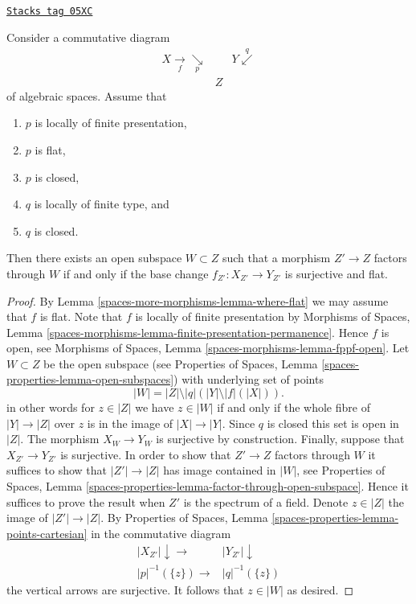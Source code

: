\begin{lemma}
\label{spaces-more-morphisms-lemma-where-surjective-flat}
\href{https://stacks.math.columbia.edu/tag/05XC}{\texttt{Stacks tag 05XC}}

Consider a commutative diagram
$$
\begin{array}{ccc}X \underset{f}{\longrightarrow}\underset{p}{\searrow} &  & Y \overset{q}{\swarrow} \\  & Z & \end{array}
$$
of algebraic spaces. Assume that
\begin{enumerate}
\item $p$ is locally of finite presentation,
\item $p$ is flat,
\item $p$ is closed,
\item $q$ is locally of finite type, and
\item $q$ is closed.
\end{enumerate}
Then there exists an open subspace $W \subset Z$
such that a morphism $Z' \to Z$ factors through $W$ if and only if the
base change $f_{Z'} : X_{Z'} \to Y_{Z'}$ is surjective and flat.
\end{lemma}

\begin{proof}
By
Lemma \ref{spaces-more-morphisms-lemma-where-flat}
we may assume that $f$ is flat.
Note that $f$ is locally of finite presentation by
Morphisms of Spaces,
Lemma \ref{spaces-morphisms-lemma-finite-presentation-permanence}.
Hence $f$ is open, see
Morphisms of Spaces, Lemma \ref{spaces-morphisms-lemma-fppf-open}.
Let $W \subset Z$ be the open subspace (see
Properties of Spaces, Lemma
\ref{spaces-properties-lemma-open-subspaces})
with underlying set of points
$$
|W| = |Z| \setminus |q|\left(|Y| \setminus |f|(|X|)\right).
$$
in other words for $z \in |Z|$ we have $z \in |W|$ if and only
if the whole fibre of $|Y| \to |Z|$ over $z$ is in the image of
$|X| \to |Y|$. Since $q$ is closed this set is open in $|Z|$.
The morphism $X_W \to Y_W$ is surjective by construction.
Finally, suppose that $X_{Z'} \to Y_{Z'}$ is surjective.
In order to show that $Z' \to Z$ factors through $W$ it suffices to show
that $|Z'| \to |Z|$ has image contained in $|W|$, see
Properties of Spaces, Lemma
\ref{spaces-properties-lemma-factor-through-open-subspace}.
Hence it suffices to prove the result when $Z'$ is the spectrum of a field.
Denote $z \in |Z|$ the image of $|Z'| \to |Z|$. By
Properties of Spaces,
Lemma \ref{spaces-properties-lemma-points-cartesian}
in the commutative diagram
$$
\begin{array}{cc}|X_{Z'}| \downarrow\longrightarrow & |Y_{Z'}| \downarrow \\ |p|^{-1}(\{z\}) \longrightarrow & |q|^{-1}(\{z\})\end{array}
$$
the vertical arrows are surjective. It follows that $z \in |W|$ as desired.
\end{proof}

